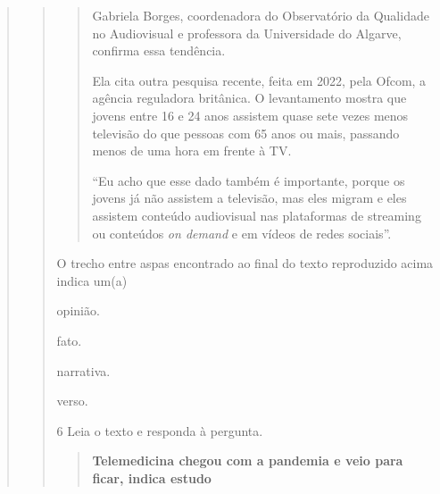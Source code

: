 \begin{escolha}
\begin{escolha}
\begin{escolha}
\begin{quote}
\begin{quote}
\begin{quote}
Gabriela Borges, coordenadora do Observatório da Qualidade no
Audiovisual e professora da Universidade do Algarve, confirma essa
tendência.

Ela cita outra pesquisa recente, feita em 2022, pela Ofcom, a agência
reguladora britânica. O levantamento mostra que jovens entre 16 e 24
anos assistem quase sete vezes menos televisão do que pessoas com 65
anos ou mais, passando menos de uma hora em frente à TV.

``Eu acho que esse dado também é importante, porque os jovens já não
assistem a televisão, mas eles migram e eles assistem conteúdo
audiovisual nas plataformas de streaming ou conteúdos \textit{on demand}
e em vídeos de redes sociais''.
\end{quote}


O trecho entre aspas encontrado ao final do texto reproduzido acima
indica um(a)

\begin{escolha}
  \item opinião.

  \item fato.

  \item narrativa.

  \item verso.
\end{escolha}


\num{6} Leia o texto e responda à pergunta.

\begin{quote}
\textbf{Telemedicina chegou com a pandemia e veio para ficar, indica estudo}


\end{quote}
\end{quote}
\end{quote}
\end{escolha}
\end{escolha}
\end{escolha}
